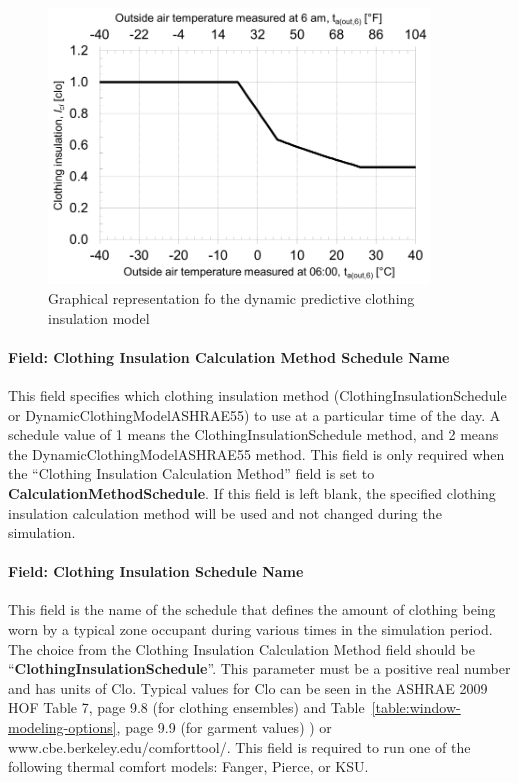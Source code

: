 \begin{figure}[hbtp] %
\centering
\includegraphics[width=0.9\textwidth, height=0.9\textheight, keepaspectratio=true]{media/image083.png}
\caption{Graphical representation fo the dynamic predictive clothing insulation model \protect \label{fig:graphical-representation-fo-the-dynamic}}
\end{figure}

\paragraph{Field: Clothing Insulation Calculation Method Schedule Name}\label{field-clothing-insulation-calculation-method-schedule-name}

This field specifies which clothing insulation method (ClothingInsulationSchedule or DynamicClothingModelASHRAE55) to use at a particular time of the day. A schedule value of 1 means the ClothingInsulationSchedule method, and 2 means the DynamicClothingModelASHRAE55 method. This field is only required when the ``Clothing Insulation Calculation Method'' field is set to \textbf{CalculationMethodSchedule}. If this field is left blank, the specified clothing insulation calculation method will be used and not changed during the simulation.

\paragraph{Field: Clothing Insulation Schedule Name}\label{field-clothing-insulation-schedule-name}

This field is the name of the schedule that defines the amount of clothing being worn by a typical zone occupant during various times in the simulation period. The choice from the Clothing Insulation Calculation Method field should be ``\textbf{ClothingInsulationSchedule}''. This parameter must be a positive real number and has units of Clo. Typical values for Clo can be seen in the ASHRAE 2009 HOF Table 7, page 9.8 (for clothing ensembles) and Table~\ref{table:window-modeling-options}, page 9.9 (for garment values) ) or www.cbe.berkeley.edu/comforttool/. This field is required to run one of the following thermal comfort models: Fanger, Pierce, or KSU. 

